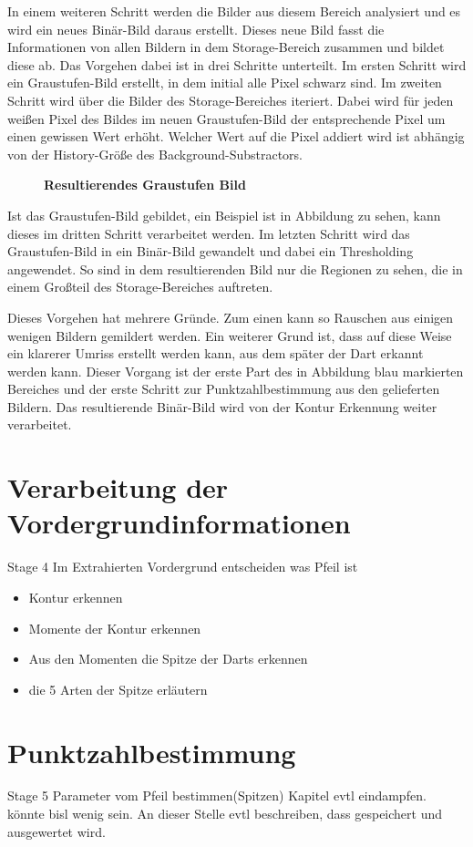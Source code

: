 In einem weiteren Schritt werden die Bilder aus diesem Bereich analysiert und es wird ein neues Binär-Bild daraus erstellt. Dieses neue Bild fasst die Informationen von allen Bildern in dem Storage-Bereich zusammen und bildet diese ab.
Das Vorgehen dabei ist in drei Schritte unterteilt.
Im ersten Schritt wird ein Graustufen-Bild erstellt, in dem initial alle Pixel schwarz sind. 
Im zweiten Schritt wird über die Bilder des Storage-Bereiches iteriert. Dabei wird für jeden weißen Pixel des Bildes im neuen Graustufen-Bild der entsprechende Pixel um einen gewissen Wert erhöht. Welcher Wert auf die Pixel addiert wird ist abhängig von der History-Größe des Background-Substractors.
\begin{figure}[ht]
\centering
{}\qquad
\caption{\textbf{Resultierendes Graustufen Bild}}
\label{Fig:greyimg}
\end{figure}
Ist das Graustufen-Bild gebildet, ein Beispiel ist in Abbildung  zu sehen, kann dieses im dritten Schritt verarbeitet werden. 
Im letzten Schritt wird das Graustufen-Bild in ein Binär-Bild gewandelt und dabei ein Thresholding angewendet. So sind in dem resultierenden Bild nur die Regionen zu sehen, die in einem Großteil des Storage-Bereiches auftreten. 

Dieses Vorgehen hat mehrere Gründe. 
Zum einen kann so Rauschen aus einigen wenigen Bildern gemildert werden. 
Ein weiterer Grund ist, dass auf diese Weise ein klarerer Umriss erstellt werden kann, aus dem später der Dart erkannt werden kann. 
Dieser Vorgang ist der erste Part des in Abbildung  blau markierten Bereiches und der erste Schritt zur Punktzahlbestimmung aus den gelieferten Bildern. Das resultierende Binär-Bild wird von der Kontur Erkennung weiter verarbeitet.

\section{Verarbeitung der Vordergrundinformationen}
\label{sec:foreground}
Stage 4 Im Extrahierten Vordergrund entscheiden was Pfeil ist
\begin{itemize}
\item Kontur erkennen
\item Momente der Kontur erkennen
\item Aus den Momenten die Spitze der Darts erkennen
\item die 5 Arten der Spitze erläutern
\end{itemize}


\section{Punktzahlbestimmung}
\label{sec:score}
Stage 5 Parameter vom Pfeil bestimmen(Spitzen)
Kapitel evtl eindampfen. könnte bisl wenig sein.
An dieser Stelle evtl beschreiben, dass gespeichert und ausgewertet wird. 

